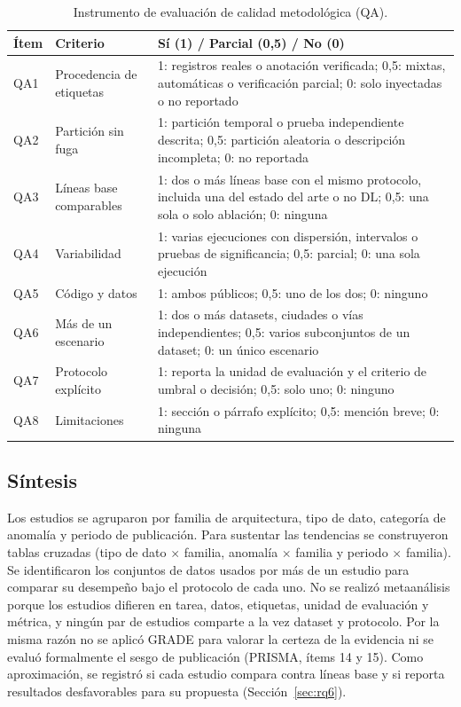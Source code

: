 \documentclass[12pt, a4paper]{article}
\begin{document}
\begin{table}[H]
\centering
\small
\caption{Instrumento de evaluaci\'{o}n de calidad metodol\'{o}gica (QA).}
\label{tab:cqi}
\begin{tabularx}{\linewidth}{lP{3.6cm}Y}
\toprule
\textbf{\'{I}tem} & \textbf{Criterio} & \textbf{S\'{i} (1) / Parcial (0,5) / No (0)} \\
\midrule
QA1 & Procedencia de etiquetas & 1: registros reales o anotaci\'{o}n verificada; 0,5: mixtas, autom\'{a}ticas o verificaci\'{o}n parcial; 0: solo inyectadas o no reportado \\
QA2 & Partici\'{o}n sin fuga & 1: partici\'{o}n temporal o prueba independiente descrita; 0,5: partici\'{o}n aleatoria o descripci\'{o}n incompleta; 0: no reportada \\
QA3 & L\'{i}neas base comparables & 1: dos o m\'{a}s l\'{i}neas base con el mismo protocolo, incluida una del estado del arte o no DL; 0,5: una sola o solo ablaci\'{o}n; 0: ninguna \\
QA4 & Variabilidad & 1: varias ejecuciones con dispersi\'{o}n, intervalos o pruebas de significancia; 0,5: parcial; 0: una sola ejecuci\'{o}n \\
QA5 & C\'{o}digo y datos & 1: ambos p\'{u}blicos; 0,5: uno de los dos; 0: ninguno \\
QA6 & M\'{a}s de un escenario & 1: dos o m\'{a}s datasets, ciudades o v\'{i}as independientes; 0,5: varios subconjuntos de un dataset; 0: un \'{u}nico escenario \\
QA7 & Protocolo expl\'{i}cito & 1: reporta la unidad de evaluaci\'{o}n y el criterio de umbral o decisi\'{o}n; 0,5: solo uno; 0: ninguno \\
QA8 & Limitaciones & 1: secci\'{o}n o p\'{a}rrafo expl\'{i}cito; 0,5: menci\'{o}n breve; 0: ninguna \\
\bottomrule
\end{tabularx}
\end{table}

\subsection{S\'{i}ntesis}

Los estudios se agruparon por familia de arquitectura, tipo de dato, categor\'{i}a de anomal\'{i}a y periodo de publicaci\'{o}n. Para sustentar las tendencias se construyeron tablas cruzadas (tipo de dato $\times$ familia, anomal\'{i}a $\times$ familia y periodo $\times$ familia). Se identificaron los conjuntos de datos usados por m\'{a}s de un estudio para comparar su desempe\~{n}o bajo el protocolo de cada uno. No se realiz\'{o} metaan\'{a}lisis porque los estudios difieren en tarea, datos, etiquetas, unidad de evaluaci\'{o}n y m\'{e}trica, y ning\'{u}n par de estudios comparte a la vez dataset y protocolo. Por la misma raz\'{o}n no se aplic\'{o} GRADE para valorar la certeza de la evidencia ni se evalu\'{o} formalmente el sesgo de publicaci\'{o}n (PRISMA, \'{i}tems 14 y 15). Como aproximaci\'{o}n, se registr\'{o} si cada estudio compara contra l\'{i}neas base y si reporta resultados desfavorables para su propuesta (Secci\'{o}n~\ref{sec:rq6}).
\end{document}
